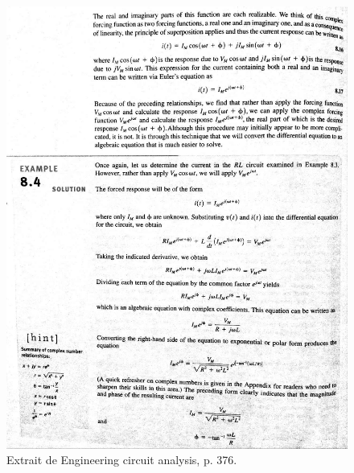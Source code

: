 \begin{figure}[h]
\begin{center}
\includegraphics[scale=0.5]{img/Irwin-2} 
\end{center}
\caption{Extrait de \cite{Irwin} Engineering circuit analysis, p. 376.}%
\label{Trace 7}
\end{figure}


\

\

 
 
 
 
 


